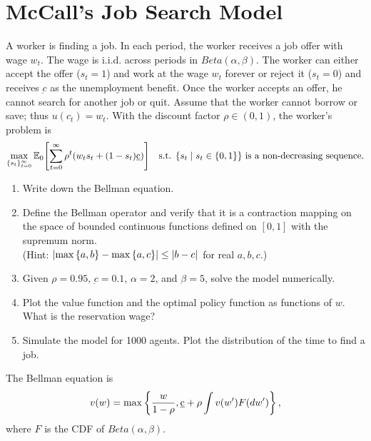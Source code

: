 \documentclass[12pt]{article}
\begin{document}
\section{McCall's Job Search Model}
A worker is finding a job. In each period, the worker receives 
a job offer with wage $w_t$. The wage is i.i.d. across periods 
in $Beta(\alpha,\beta)$. The worker can either 
accept the offer ($s_t=1$) and work at the wage $w_t$ forever 
or reject it ($s_t=0$) and receives $\underbar{c}$ as the 
unemployment benefit. Once the worker accepts an offer, he 
cannot search for another job or quit. Assume that the worker 
cannot borrow or save; thus $u(c_t)=w_t$. 
With the discount factor $\rho\in(0,1)$, the worker's problem 
is 
\begin{equation*}
    \max_{\{s_t\}_{t=0}^\infty} \E_0\sbrc{\sum_{t=0}^\infty \rho^t(w_ts_t+(1-s_t)\underbar{c})}\quad \text{s.t. $\Set{s_t}{s_t\in\set{0,1}}$ is a non-decreasing sequence}.
\end{equation*}
\begin{enumerate}
    \item Write down the Bellman equation.
    \item Define the Bellman operator and verify that it is a 
    contraction mapping on the space of bounded continuous functions 
    defined on $[0,1]$ with the supremum norm.\\
    (Hint: $\left\lvert {\max\left\{ {a,b} \right\}-\max\left\{ {a,c} \right\}} \right\rvert\leq\left\lvert {b-c} \right\rvert$ for real $a,b,c$.)
    \item Given $\rho = 0.95$, $\underbar{c} = 0.1$, $\alpha = 2$, 
    and $\beta = 5$, solve the model numerically.
    \item Plot the value function and the optimal policy function as functions 
    of $w$. What is the reservation wage? 
    \item Simulate the model for 1000 agents. Plot the distribution of the 
    time to find a job.
\end{enumerate}
\begin{sol}[4.1]
    The Bellman equation is 
    \begin{equation*}
        v(w) = \max \left\{ {\frac{w}{1-\rho}, \underbar{c} + \rho \int v(w') F(dw')} \right\},
    \end{equation*}
    where $F$ is the CDF of $Beta(\alpha,\beta)$.
\end{sol}
\end{document}
